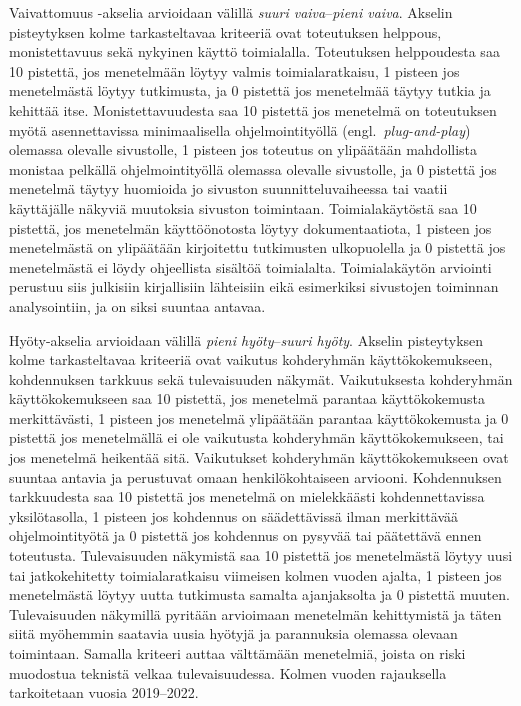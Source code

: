 \documentclass[finnish, 12pt, a4paper, elec, utf8, a-1b]{aaltothesis}
\begin{document}
Vaivattomuus -akselia arvioidaan välillä \textit{suuri vaiva}--\textit{pieni
vaiva}. Akselin pisteytyksen kolme tarkasteltavaa kriteeriä ovat toteutuksen
helppous, monistettavuus sekä nykyinen käyttö toimialalla. Toteutuksen
helppoudesta saa 10 pistettä, jos menetelmään löytyy valmis toimialaratkaisu, 1
pisteen jos menetelmästä löytyy tutkimusta, ja 0 pistettä jos menetelmää täytyy
tutkia ja kehittää itse. Monistettavuudesta saa 10 pistettä jos menetelmä on
toteutuksen myötä asennettavissa minimaalisella ohjelmointityöllä
(engl.~\textit{plug-and-play}) olemassa olevalle sivustolle, 1 pisteen jos
toteutus on ylipäätään mahdollista monistaa pelkällä ohjelmointityöllä
olemassa olevalle sivustolle, ja 0 pistettä jos menetelmä täytyy huomioida jo
sivuston suunnitteluvaiheessa tai vaatii käyttäjälle näkyviä muutoksia sivuston
toimintaan. Toimialakäytöstä saa 10 pistettä, jos menetelmän käyttöönotosta
löytyy dokumentaatiota, 1 pisteen jos menetelmästä on ylipäätään kirjoitettu
tutkimusten ulkopuolella ja 0 pistettä jos menetelmästä ei löydy ohjeellista
sisältöä toimialalta. Toimialakäytön arviointi perustuu siis julkisiin
kirjallisiin lähteisiin eikä esimerkiksi sivustojen toiminnan analysointiin, ja
on siksi suuntaa antavaa.

Hyöty-akselia arvioidaan välillä \textit{pieni hyöty}--\textit{suuri hyöty}.
Akselin pisteytyksen kolme tarkasteltavaa kriteeriä ovat vaikutus kohderyhmän
käyttökokemukseen, kohdennuksen tarkkuus sekä tulevaisuuden näkymät.
Vaikutuksesta kohderyhmän käyttökokemukseen saa 10 pistettä, jos menetelmä
parantaa käyttökokemusta merkittävästi, 1 pisteen jos menetelmä ylipäätään
parantaa käyttökokemusta ja 0 pistettä jos menetelmällä ei ole vaikutusta
kohderyhmän käyttökokemukseen, tai jos menetelmä heikentää sitä. Vaikutukset
kohderyhmän käyttökokemukseen ovat suuntaa antavia ja perustuvat omaan
henkilökohtaiseen arviooni. Kohdennuksen tarkkuudesta saa 10 pistettä jos
menetelmä on mielekkäästi kohdennettavissa yksilötasolla, 1 pisteen jos
kohdennus on säädettävissä ilman merkittävää ohjelmointityötä ja 0 pistettä jos
kohdennus on pysyvää tai päätettävä ennen toteutusta. Tulevaisuuden näkymistä
saa 10 pistettä jos menetelmästä löytyy uusi tai jatkokehitetty toimialaratkaisu
viimeisen kolmen vuoden ajalta, 1 pisteen jos menetelmästä löytyy uutta
tutkimusta samalta ajanjaksolta ja 0 pistettä muuten. Tulevaisuuden näkymillä
pyritään arvioimaan menetelmän kehittymistä ja täten siitä myöhemmin saatavia
uusia hyötyjä ja parannuksia olemassa olevaan toimintaan. Samalla kriteeri auttaa
välttämään menetelmiä, joista on riski muodostua teknistä velkaa tulevaisuudessa.
Kolmen vuoden rajauksella tarkoitetaan vuosia 2019--2022.
\end{document}
